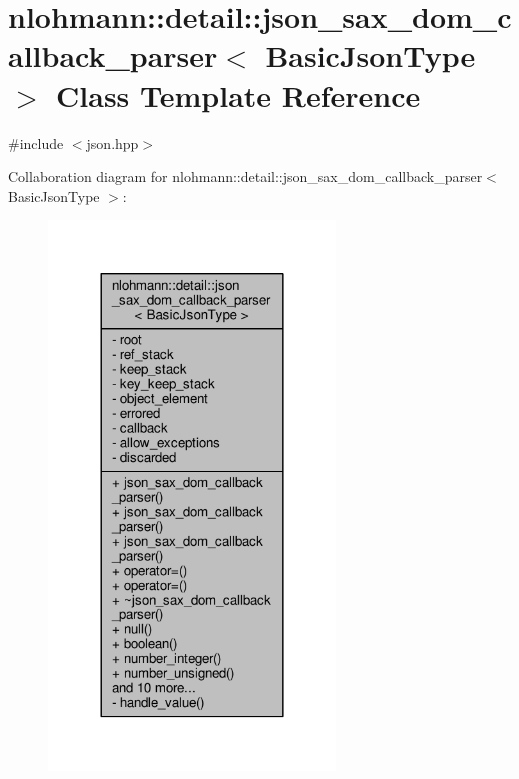 \hypertarget{classnlohmann_1_1detail_1_1json__sax__dom__callback__parser}{}\section{nlohmann\+:\+:detail\+:\+:json\+\_\+sax\+\_\+dom\+\_\+callback\+\_\+parser$<$ Basic\+Json\+Type $>$ Class Template Reference}
\label{classnlohmann_1_1detail_1_1json__sax__dom__callback__parser}


{\ttfamily \#include $<$json.\+hpp$>$}



Collaboration diagram for nlohmann\+:\+:detail\+:\+:json\+\_\+sax\+\_\+dom\+\_\+callback\+\_\+parser$<$ Basic\+Json\+Type $>$\+:
\nopagebreak
\begin{figure}[H]
\begin{center}
\leavevmode
\includegraphics[width=216pt]{classnlohmann_1_1detail_1_1json__sax__dom__callback__parser__coll__graph}
\end{center}
\end{figure}
